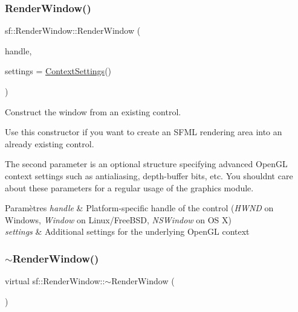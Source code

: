 \subsubsection{\texorpdfstring{Render\+Window()}{RenderWindow()}\hspace{0.1cm}{\footnotesize\ttfamily [3/3]}}
{\footnotesize\ttfamily sf\+::\+Render\+Window\+::\+Render\+Window (\begin{DoxyParamCaption}\item[{Window\+Handle}]{handle,  }\item[{const \hyperlink{structsf_1_1ContextSettings}{Context\+Settings} \&}]{settings = {\ttfamily \hyperlink{structsf_1_1ContextSettings}{Context\+Settings}()} }\end{DoxyParamCaption})\hspace{0.3cm}{\ttfamily [explicit]}}



Construct the window from an existing control. 

Use this constructor if you want to create an S\+F\+ML rendering area into an already existing control.

The second parameter is an optional structure specifying advanced Open\+GL context settings such as antialiasing, depth-\/buffer bits, etc. You shouldn\textquotesingle{}t care about these parameters for a regular usage of the graphics module.


\begin{DoxyParams}{Paramètres}
{\em handle} & Platform-\/specific handle of the control ({\itshape H\+W\+ND} on Windows, {\itshape Window} on Linux/\+Free\+B\+SD, {\itshape N\+S\+Window} on OS X) \\
\hline
{\em settings} & Additional settings for the underlying Open\+GL context \\
\hline
\end{DoxyParams}
\mbox{\label{classsf_1_1RenderWindow_a3407e36bfc1752d723140438a825365c}} 
\subsubsection{\texorpdfstring{$\sim$\+Render\+Window()}{~RenderWindow()}}
{\footnotesize\ttfamily virtual sf\+::\+Render\+Window\+::$\sim$\+Render\+Window (\begin{DoxyParamCaption}{ }\end{DoxyParamCaption})\hspace{0.3cm}{\ttfamily [virtual]}}



